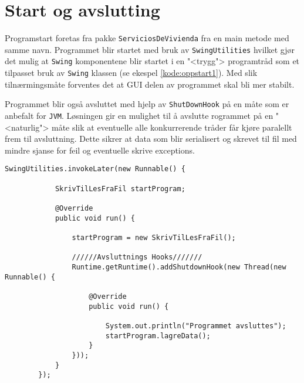 \section{Start og avslutting}
Programstart foretas fra pakke \texttt{ServiciosDeVivienda} fra en main metode med samme navn. Programmet blir startet med bruk av \texttt{SwingUtilities} hvilket gjør det mulig at \texttt{Swing} komponentene blir startet i en "<trygg"> programtråd som et tilpasset bruk av \texttt{Swing} klassen (se ekespel \ref{kode:oppstart1}). Med slik tilnærmingsmåte forventes det at GUI delen av programmet skal bli mer stabilt. 

Programmet blir også avsluttet med hjelp av \texttt{ShutDownHook} på en måte som er anbefalt for \texttt{JVM}. Løsningen gir en mulighet til å avslutte rogrammet på en "<naturlig"> måte slik at eventuelle alle konkurrerende tråder får kjøre paralellt frem til avsluttning. Dette sikrer at data som blir serialisert og skrevet til fil med mindre sjanse for feil og eventuelle skrive exceptions.

\begin{lstlisting}[caption=Oppstart av programmet., label=kode:oppstart1]
        SwingUtilities.invokeLater(new Runnable() {

            SkrivTilLesFraFil startProgram;

            @Override
            public void run() {

                startProgram = new SkrivTilLesFraFil();

                //////Avsluttnings Hooks///////
                Runtime.getRuntime().addShutdownHook(new Thread(new Runnable() {

                    @Override
                    public void run() {

                        System.out.println("Programmet avsluttes");
                        startProgram.lagreData();
                    }
                }));
            }
        });
\end{lstlisting}